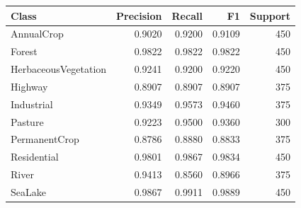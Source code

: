 \begin{tabular}{lrrrr}
\toprule
Class & Precision & Recall & F1 & Support \\
\midrule
AnnualCrop & 0.9020 & 0.9200 & 0.9109 & 450 \\
Forest & 0.9822 & 0.9822 & 0.9822 & 450 \\
HerbaceousVegetation & 0.9241 & 0.9200 & 0.9220 & 450 \\
Highway & 0.8907 & 0.8907 & 0.8907 & 375 \\
Industrial & 0.9349 & 0.9573 & 0.9460 & 375 \\
Pasture & 0.9223 & 0.9500 & 0.9360 & 300 \\
PermanentCrop & 0.8786 & 0.8880 & 0.8833 & 375 \\
Residential & 0.9801 & 0.9867 & 0.9834 & 450 \\
River & 0.9413 & 0.8560 & 0.8966 & 375 \\
SeaLake & 0.9867 & 0.9911 & 0.9889 & 450 \\
\bottomrule
\end{tabular}
